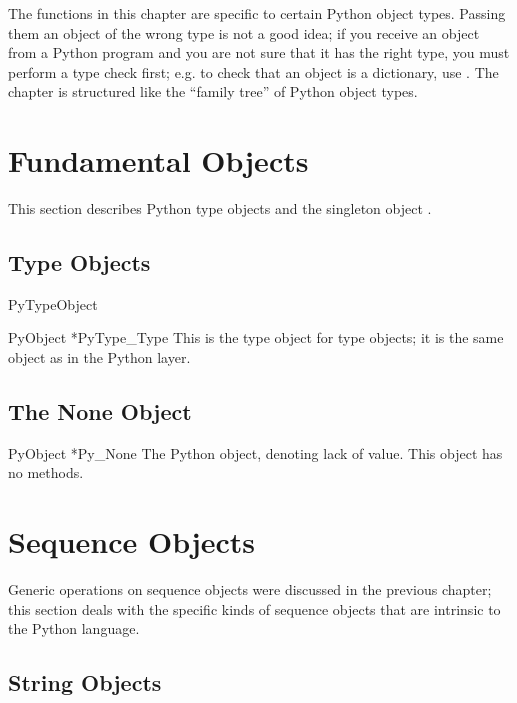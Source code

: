 \documentclass{manual}
\begin{document}
The functions in this chapter are specific to certain Python object
types.  Passing them an object of the wrong type is not a good idea;
if you receive an object from a Python program and you are not sure
that it has the right type, you must perform a type check first;
e.g. to check that an object is a dictionary, use
.  The chapter is structured like the
``family tree'' of Python object types.


\section{Fundamental Objects \label{fundamental}}

This section describes Python type objects and the singleton object 
.


\subsection{Type Objects \label{typeObjects}}

\begin{ctypedesc}{PyTypeObject}

\end{ctypedesc}

\begin{cvardesc}{PyObject *}{PyType_Type}
This is the type object for type objects; it is the same object as
 in the Python layer.
\end{cvardesc}


\subsection{The None Object \label{noneObject}}

\begin{cvardesc}{PyObject *}{Py_None}
The Python  object, denoting lack of value.  This object has
no methods.
\end{cvardesc}


\section{Sequence Objects \label{sequenceObjects}}

Generic operations on sequence objects were discussed in the previous 
chapter; this section deals with the specific kinds of sequence 
objects that are intrinsic to the Python language.


\subsection{String Objects \label{stringObjects}}
\end{document}
